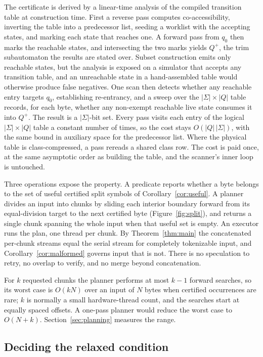 \documentclass[11pt,a4paper]{article}
\theoremstyle{definition}
\theoremstyle{plain}
\begin{document}
The certificate is derived by a linear-time analysis of the compiled transition table at construction time. First a
reverse pass computes co-accessibility, inverting the table into a predecessor list, seeding a worklist with the
accepting states, and marking each state that reaches one. A forward pass from $q_0$ then marks the reachable states,
and intersecting the two marks yields $Q^+$, the trim subautomaton the results are stated over. Subset construction
emits only reachable states, but the analysis is exposed on a simulator that accepts any transition table, and an
unreachable state in a hand-assembled table would otherwise produce false negatives. One scan then detects whether any
reachable entry targets $q_0$, establishing re-entrancy, and a sweep over the $|\Sigma| \times |Q|$ table records, for
each byte, whether any non-exempt reachable live state consumes it into $Q^+$. The result is a $|\Sigma|$-bit set. Every
pass visits each entry of the logical $|\Sigma| \times |Q|$ table a constant number of times, so the cost stays
$O(|Q|\,|\Sigma|)$, with the same bound in auxiliary space for the predecessor list. Where the physical table is
class-compressed, a pass rereads a shared class row. The cost is paid once, at the same asymptotic order as building the
table, and the scanner's inner loop is untouched.

Three operations expose the property. A predicate reports whether a byte belongs to the set of useful certified split
symbols of Corollary~\ref{cor:useful}. A planner divides an input into chunks by sliding each interior boundary forward
from its equal-division target to the next certified byte (Figure~\ref{fig:split}), and returns a single chunk spanning
the whole input when that useful set is empty. An executor runs the plan, one thread per chunk. By
Theorem~\ref{thm:main} the concatenated per-chunk streams equal the serial stream for completely tokenizable input, and
Corollary~\ref{cor:malformed} governs input that is not. There is no speculation to retry, no overlap to verify, and no
merge beyond concatenation.

For $k$ requested chunks the planner performs at most $k-1$ forward searches, so its worst case is $O(kN)$ over an input
of $N$ bytes when certified occurrences are rare; $k$ is normally a small hardware-thread count, and the searches start
at equally spaced offsets. A one-pass planner would reduce the worst case to $O(N + k)$. Section~\ref{sec:planning}
measures the range.

\subsection{Deciding the relaxed condition}
\label{sec:decide}
\end{document}
